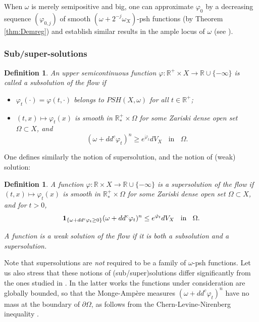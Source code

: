 \documentclass[11pt]{amsart}
\numberwithin{equation}{section}
\newtheorem{defi}[theorem]{Definition}
\newcommand{\R}{\mathbb R}
\newcommand{\f}{\varphi}
\begin{document}
\medskip

When $\omega$ is merely semipositive and big, one can approximate $\f_0$ by a decreasing sequence $(\f_{0,j})$ of 
smooth $(\omega+2^{-j} \omega_X)$-psh functions (by Theorem \ref{thm:Demreg}) 
and establish similar results in the ample locus of $\omega$ (see \cite{Dan25}).
 





\subsubsection*{Sub/super-solutions}
 
  

\begin{defi}
An upper semicontinuous function $\f: \mathbb R^+ \times X \rightarrow \R \cup \{-\infty\}$ is called a subsolution  of the flow if 
\begin{itemize}
\item $\f_t(\cdot)=\f(t,\cdot)$ belongs to $PSH(X,\omega)$ for all $t \in \R^+$; 
\item $(t,x) \mapsto \f_t(x)$ is smooth in $\R^+_* \times \Omega$ for
some Zariski dense open set $\Omega \subset X$, and
$$
(\omega+dd^c \varphi_{t})^n \geq e^{\dot \varphi_{t}}dV_X
\; \; \text{ in } \; \;
\Omega.
$$
\end{itemize}
\end{defi}




One defines similarly the notion of supersolution, and the notion of (weak) solution: 

 \begin{defi}
A function $\f: \R \times X  \rightarrow \R \cup \{-\infty\}$ is  a supersolution of the flow if 
 $(t,x) \mapsto \f_t(x)$ is smooth in $\R^+_* \times \Omega$ for
some Zariski dense open set $\Omega \subset X$, and for  $t>0$,
$$
{\bf 1}_{\{\omega +dd^c \varphi_t \geq 0\}} (\omega+dd^c \varphi_{t})^n \leq e^{\dot \varphi_{t}}dV_X
\; \; \text{ in } \; \;
\Omega.
$$

A function  is   a weak solution of the flow
if it is both a subsolution and a supersolution.
\end{defi}

Note that supersolutions are {\it not} required to be a family of $\omega$-psh functions.
Let us also stress that these notions of (sub/super)solutions differ significantly
from the ones studied in \cite{GLZ20,GLZ21}. In the latter works the functions under consideration
are globally bounded, so that the Monge-Amp\`ere measures 
$(\omega+dd^c \varphi_{t})^n$ have no mass at the boundary of $\partial \Omega$,
as follows from the Chern-Levine-Nirenberg inequality \cite[Theorem 3.14]{GZbook}.
\end{document}
